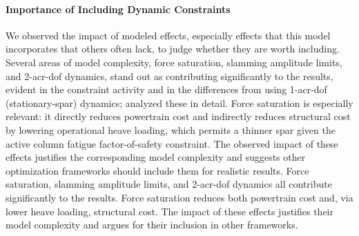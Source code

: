 \paragraph{Importance of Including Dynamic Constraints}
We observed the impact of modeled effects, especially effects that this model incorporates that others often lack, to judge whether they are worth including.
\ifdefined\DISSERTATION
    Several areas of model complexity, force saturation, slamming amplitude limits, and 2-\gls{acr-dof} dynamics, stand out as contributing significantly to the results, evident in the constraint activity and in the differences from using 1-\gls{acr-dof} (stationary-spar) dynamics;  analyzed these in detail.
    Force saturation is especially relevant: it directly reduces powertrain cost and indirectly reduces structural cost by lowering operational heave loading, which permits a thinner spar given the active column fatigue factor-of-safety constraint.
    The observed impact of these effects justifies the corresponding model complexity and suggests other optimization frameworks should include them for realistic results.
\else
    Force saturation, slamming amplitude limits, and 2-\gls{acr-dof} dynamics all contribute significantly to the results. %
    Force saturation reduces both powertrain cost and, via lower heave loading, structural cost.
    The impact of these effects justifies their model complexity and argues for their inclusion in other frameworks.
\fi

